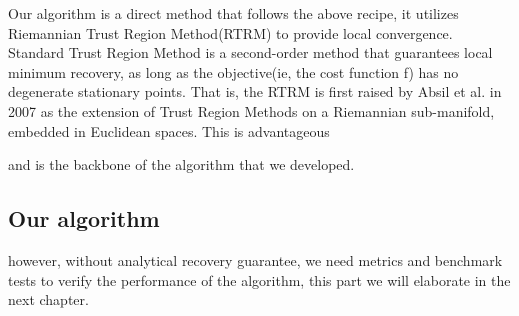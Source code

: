 Our algorithm is a direct method that follows the above recipe, it utilizes Riemannian Trust Region Method(RTRM) to provide local convergence. Standard Trust Region Method is a second-order method that guarantees local minimum recovery, as long as the objective(ie, the cost function f) has no degenerate stationary points. That is, the 
\ac{RTRM} is first raised by Absil et al. in 2007 as the extension of Trust Region Methods on a Riemannian sub-manifold, embedded in Euclidean spaces. This is advantageous 

and is the backbone of the algorithm that we developed. 


\subsection{Our algorithm}


however, without analytical recovery guarantee, we need metrics and benchmark tests to verify the performance of the algorithm, this part we will elaborate in the next chapter. 
